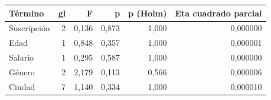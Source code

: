 \begin{tabular}{lrrrrr}
\toprule
Término & gl & F & p & p (Holm) & Eta cuadrado parcial \\
\midrule
Suscripción & 2 & 0,136 & 0,873 & 1,000 & 0,000000 \\
Edad & 1 & 0,848 & 0,357 & 1,000 & 0,000001 \\
Salario & 1 & 0,295 & 0,587 & 1,000 & 0,000000 \\
Género & 2 & 2,179 & 0,113 & 0,566 & 0,000006 \\
Ciudad & 7 & 1,140 & 0,334 & 1,000 & 0,000010 \\
\bottomrule
\end{tabular}
